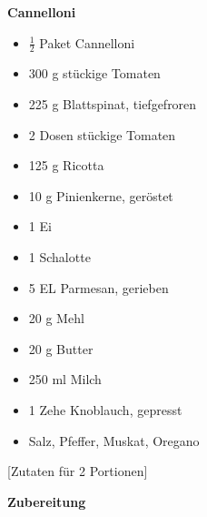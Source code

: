 

\parindent0pt	

\pagestyle{empty}


\textbf{{\LARGE Cannelloni}}%

\hrulefill
\vspace*{\fill}
\begin{multicols}{2}	


\begin{itemize}
\item $\frac{1}{2}$ Paket Cannelloni
\item 300 g stückige Tomaten
\item 225 g Blattspinat, tiefgefroren
\item 2 Dosen	stückige Tomaten
\item 125 g Ricotta
\item 10 g Pinienkerne, geröstet
\item 1 Ei
\item 1 Schalotte
\item 5 EL Parmesan, gerieben
\item 20 g Mehl
\item 20 g Butter
\item 250 ml Milch
\item 1 Zehe Knoblauch, gepresst
\item Salz, Pfeffer, Muskat, Oregano
\end{itemize}
\end{multicols}
\vfill									%

\vspace{1cm}
%
\begin{center}
%
[Zutaten für 2 Portionen]%
\end{center}


\vfill
\newpage
\textbf{{\LARGE Zubereitung}}%

\hrulefill

